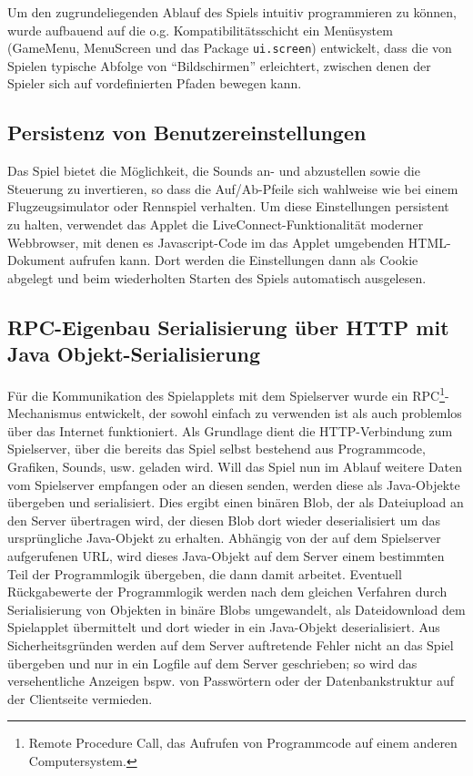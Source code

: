 \documentclass[a4paper,12pt]{scrartcl}
\begin{document}
Um den zugrundeliegenden Ablauf des Spiels intuitiv programmieren zu können, wurde
aufbauend auf die o.g. Kompatibilitätsschicht ein Menüsystem (GameMenu, MenuScreen
und das Package \texttt{ui.screen}) entwickelt, dass die von Spielen typische
Abfolge von "`Bildschirmen"' erleichtert, zwischen denen der Spieler sich auf vordefinierten Pfaden
bewegen kann.

\subsection{Persistenz von Benutzereinstellungen}
Das Spiel bietet die Möglichkeit, die Sounds an- und abzustellen sowie die Steuerung zu
invertieren, so dass die Auf/Ab-Pfeile sich wahlweise wie bei einem Flugzeugsimulator oder
Rennspiel verhalten. Um diese Einstellungen persistent zu halten, verwendet das Applet die
LiveConnect-Funktionalität moderner Webbrowser, mit denen es Javascript-Code im das
Applet umgebenden HTML-Dokument aufrufen kann. Dort werden die Einstellungen dann
als Cookie abgelegt und beim wiederholten Starten des Spiels automatisch ausgelesen.

\subsection{RPC-Eigenbau Serialisierung über HTTP mit Java
Objekt-Serialisierung}
Für die Kommunikation des Spielapplets mit dem
Spielserver wurde ein RPC\footnote{Remote Procedure Call, das Aufrufen von
Programmcode auf einem anderen Computersystem.}-Mecha\-nismus entwickelt, der
sowohl einfach zu verwenden ist als auch problemlos über das Internet funktioniert. Als Grundlage dient die HTTP-Verbindung zum Spielserver, über die bereits
das Spiel selbst bestehend aus Programmcode, Grafiken, Sounds, usw. geladen wird.
Will das Spiel nun im Ablauf weitere Daten vom Spielserver empfangen oder an diesen
senden, werden diese als Java-Objekte übergeben und serialisiert. Dies ergibt einen binären
Blob, der als Dateiupload an den Server übertragen wird, der diesen Blob dort wieder
deserialisiert um das ursprüngliche Java-Objekt zu erhalten. Abhängig von der auf dem
Spielserver aufgerufenen URL, wird dieses Java-Objekt auf dem Server einem bestimmten
Teil der Programmlogik übergeben, die dann damit arbeitet. Eventuell Rückgabewerte der
Programmlogik werden nach dem gleichen Verfahren durch Serialisierung von Objekten
in binäre Blobs umgewandelt, als Dateidownload dem Spielapplet übermittelt und dort
wieder in ein Java-Objekt deserialisiert. Aus Sicherheitsgründen werden auf dem Server
auftretende Fehler nicht an das Spiel übergeben und nur in ein Logfile auf dem Server
geschrieben; so wird das versehentliche Anzeigen bspw. von Passwörtern oder der
Datenbankstruktur auf der Clientseite vermieden.
\end{document}
